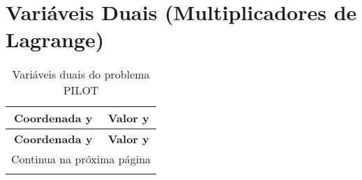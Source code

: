 \documentclass[12pt]{article}
\begin{document}
\section{Variáveis Duais (Multiplicadores de Lagrange)}

\begin{longtable}{@{}cc@{}}
\caption{Variáveis duais do problema PILOT} \\
\toprule
\textbf{Coordenada y} & \textbf{Valor y} \\
\midrule
\endfirsthead

\toprule
\textbf{Coordenada y} & \textbf{Valor y} \\
\midrule
\endhead

\midrule \multicolumn{2}{r}{{Continua na próxima página}} \\ \midrule
\endfoot


\end{longtable}
\end{document}
